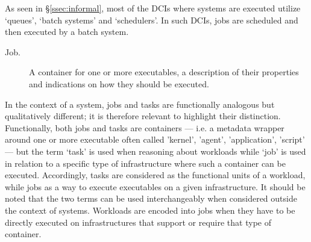\documentclass{sig-alternate}
\begin{document}
\begin{description}

\end{description}

As seen in \S\ref{ssec:informal}, most of the DCIs where \pilotjobs systems
are executed utilize `queues', `batch systems' and `schedulers'. In such DCIs,
jobs are scheduled and then executed by a batch system.

\begin{description}

\item[Job.] A container for one or more executables, a description of
their properties and indications on how they should be executed.

\end{description}

In the context of a \pilotjob system, jobs and tasks are functionally
analogous but qualitatively different; it is therefore relevant to
highlight their distinction. Functionally, both jobs and tasks are
containers --- i.e. a metadata wrapper around one or more executable
often called 'kernel', 'agent', 'application', 'script' --- but the term
`task' is used when reasoning about workloads while `job' is used in
relation to a specific type of infrastructure where such a container can
be executed. Accordingly, tasks are considered as the functional units
of a workload, while jobs as a way to execute executables on a given
infrastructure. It should be noted that the two terms can be used
interchangeably when considered outside the context of \pilotjob
systems.
Workloads are encoded into jobs when they have to be directly
executed on infrastructures that support or require that type of
container.
\end{document}

